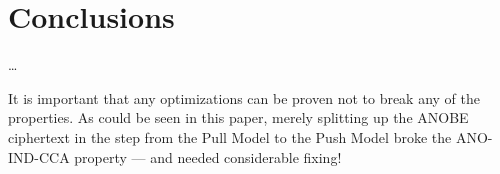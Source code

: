 %
%
%
%


\section{Conclusions}\label{Conclusions}

\dots

It is important that any optimizations can be proven not to break any of the 
properties.
As could be seen in this paper, merely splitting up the \ac{ANOBE} ciphertext 
in the step from the Pull Model to the Push Model broke the ANO-IND-CCA 
property --- and needed considerable fixing!

